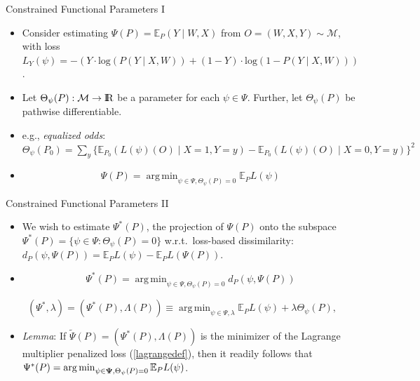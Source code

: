 \documentclass[12pt,t,handout]{beamer}
\newcommand{\E}{\mathbb{E}}
\DeclareMathOperator*{\argmin}{arg\,min}
\newcommand{\openr}{\hbox{${\rm I\kern-.2em R}$}}
\begin{document}

\begin{frame}[c]{Constrained Functional Parameters I}

\begin{center}
\begin{itemize}
  \itemsep12pt
  \item Consider estimating $\Psi(P) = \E_P(Y \mid W, X)$ from $O = (W, X, Y)
    \sim \mathcal{M}$, with loss $L_Y(\psi) = -(Y \cdot \text{log}(P(Y \mid X,
    W)) + (1 - Y) \cdot \text{log}(1 - P(Y \mid X, W)))$.
  \item Let $\Theta_{\psi}(P): \mathcal{M} \rightarrow \openr$ be a parameter
    for each $\psi \in \Psi$. Further, let $\Theta_{\psi}(P)$ be pathwise
    differentiable.
  \item e.g., \textit{equalized odds}: $\Theta_{\psi}(P_0) = \sum_y
    \{\E_{P_0}(L(\psi)(O) \mid X = 1, Y = y) - \E_{P_0}(L(\psi)(O) \mid X = 0,
    Y = y)\}^2$
  \item $$ \Psi(P) = \argmin_{\psi \in \Psi, \Theta_{\psi}(P) = 0} \E_PL(\psi)$$
\end{itemize}
\end{center}

\note{
}

\end{frame}


\begin{frame}[c]{Constrained Functional Parameters II}

\begin{center}
\begin{itemize}
  \itemsep12pt
  \item We wish to estimate $\Psi^*(P)$, the projection of $\Psi(P)$ onto the
    subspace $\Psi^*(P) = \{\psi \in \Psi: \Theta_{\psi}(P) = 0\}$
    w.r.t.~loss-based dissimilarity: $d_{P}(\psi, \Psi(P)) = \E_PL(\psi) -
    \E_PL(\Psi(P))$.
  \item $$ \Psi^*(P) = \argmin_{\psi \in \Psi, \Theta_{\psi}(P) = 0} d_{P}(\psi,
    \Psi(P))$$
\end{itemize}

\begin{equation}\label{lagrangedef}
  (\Psi^*, \lambda) = (\Psi^*(P), \Lambda(P)) \equiv \argmin_{\psi \in \Psi,
    \lambda} \E_PL(\psi) + \lambda \Theta_{\psi}(P),
\end{equation}

\begin{itemize}
  \item \textit{Lemma}: If $\widetilde{\Psi}(P) = (\Psi^*(P), \Lambda(P))$ is
    the minimizer of the Lagrange multiplier penalized loss (\ref{lagrangedef}),
    then it readily follows that $\Psi^*(P) = \argmin_{\psi \in {\bf \Psi},
      \Theta_{\psi}(P) = 0} \E_{P}L(\psi)$.
\end{itemize}

\end{center}

\note{
}

\end{frame}
\end{document}
